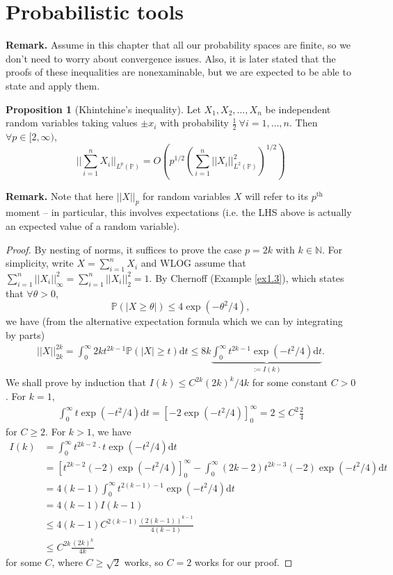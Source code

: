 \documentclass{article}
\theoremstyle{definition}
\newtheorem{prop}[theorem]{Proposition}
\begin{document}
\section{Probabilistic tools}
\textbf{Remark.} Assume in this chapter that all our probability spaces are finite, so we don't need to worry about convergence issues. Also, it is later stated that the proofs of these inequalities are nonexaminable, but we are expected to be able to state and apply them.
\begin{prop}[Khintchine's inequality]\label{prop3.1}
    Let $X_1,X_2,\ldots,X_n$ be independent random variables taking values $\pm x_i$ with probability $\frac{1}{2} ~\forall i=1,\ldots,n$. Then $\forall p \in [2,\infty)$, \[
    ||\sum_{i=1}^{n} X_i ||_{L^p(\mathbb{P})} = O \left(p^{1/2}\left(\sum_{i=1}^{n} ||X_i||_{L^2(\mathbb{P})}^2\right)^{1/2}\right)
    \]
\end{prop}
\textbf{Remark.} Note that here $||X||_{p}$ for random variables $X$ will refer to its $p^{\text{th}}$ moment -- in particular, this involves expectations (i.e. the LHS above is actually an expected value of a random variable).
\begin{proof}
    
    By nesting of norms, it suffices to prove the case $p = 2k$ with $k \in \mathbb{N}$. For simplicity, write $X = \sum_{i=1}^{n} X_i$ and WLOG assume that $\sum_{i=1}^{n} ||X_i||_{\infty}^2 = \sum_{i=1}^{n} ||X_i||_2^2 = 1$. By Chernoff (Example \ref{ex1.3}), which states that $\forall \theta >0$, \[
    \mathbb{P}\left(\left|X\ge \theta\right|\right) \le 4 \exp(-\theta^2/4),
    \]
    we have (from the alternative expectation formula which we can by integrating by parts)
    \begin{align*}
        ||X||_{2k}^{2k} = \int_{0}^{\infty} 2k t^{2k-1}\mathbb{P}\left(\left|X\right|\ge t\right)\mathrm{d}t \le 8k \underbrace{\int_{0}^{\infty} t^{2k-1}\exp(-t^2/4)\mathrm{d}t}_{:=I(k)}.
    \end{align*}
    We shall prove by induction that $I(k) \le C^{2k}(2k)^k/4k$ for some constant $C>0$. For $k=1$, 
    \begin{align*}
        \int_{0}^{\infty} t \exp \left(-t^2/4\right) \mathrm{d}t = [-2\exp \left(-t^2/4\right)]_0^{\infty} = 2 \le C^2\frac{2}{4} 
    \end{align*}
    for $C \ge 2$. For $k>1$, we have 
    \begin{align*}
        I(k) &= \int_{0}^{\infty}  t^{2k-2} \cdot t \exp \left(-t^2/4\right) \mathrm{d}t \\
        &= [t^{2k-2}(-2)\exp \left(-t^2/4\right)]_0^\infty - \int_{0}^{\infty} (2k-2)t^{2k-3}(-2)\exp \left(-t^2/4 \right)\mathrm{d}t \\
        &= 4(k-1)\int_{0}^{\infty} t^{2(k-1)-1} \exp(-t^2/4)\mathrm{d}t \\
        &= 4(k-1)I(k-1) \\
        &\le 4(k-1) C^{2(k-1)}\frac{(2(k-1))^{k-1}}{4(k-1)} \\
        &\le C^{2k}\frac{(2k)^k}{4k}
    \end{align*}
    for some $C$, where $C\ge \sqrt{2}$ works, so $C=2$ works for our proof.
\end{proof}
\end{document}
